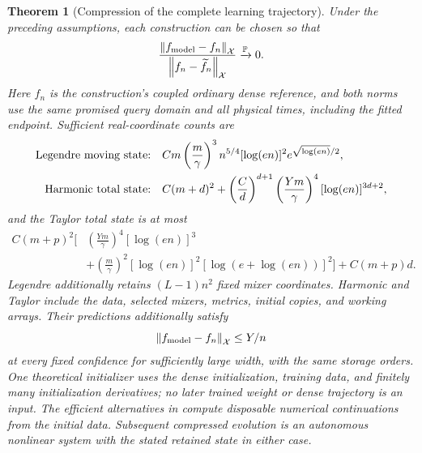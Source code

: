 \documentclass[11pt]{article}
\newtheorem{theorem}{Theorem}[section]
\theoremstyle{definition}
\theoremstyle{remark}
\newcommand{\norm}[1]{\left\lVert#1\right\rVert}
\begin{document}
\begin{theorem}[Compression of the complete learning trajectory]
\label{cp:headline}
Under the preceding assumptions, each construction can be chosen so that
\begin{equation}
 \frac{\norm{f_{\rm model}-f_n}_{\mathcal X}}
      {\norm{f_n-\widetilde f_n}_{\mathcal X}}
       \xrightarrow{\mathbb P}0.
 \label{cp:relative}
\end{equation}
Here $f_n$ is the construction's coupled ordinary dense reference, and both
norms use the same promised query domain and all physical times, including
the fitted endpoint. Sufficient real-coordinate counts are
\begin{align}
 \textnormal{Legendre moving state:}\quad&
 Cm\left(\frac m\gamma\right)^3 n^{5/4}
 [\log(en)]^2e^{\sqrt{\log(en)}/2},
 \label{cp:legendre-size}\\
 \textnormal{Harmonic total state:}\quad&
 C(m+d)^2+\left(\frac Cd\right)^{d+1}
       \left(\frac{Ym}\gamma\right)^4[\log(en)]^{3d+2},
 \label{cp:harmonic-size}
\end{align}
and the Taylor total state is at most
\begin{equation}
 \begin{split}
 C(m+p)^2\bigg[&
       \left(\frac{Ym}\gamma\right)^4[\log(en)]^3
       \\ &+\left(\frac m\gamma\right)^2[\log(en)]^2
                     [\log(e+\log(en))]^2\bigg]
       +C(m+p)d.
 \end{split}
 \label{cp:panel-size}
\end{equation}
Legendre additionally retains $(L-1)n^2$ fixed mixer coordinates.
Harmonic and Taylor include the data, selected mixers, metrics, initial
copies, and working arrays. Their predictions additionally satisfy
\begin{equation}
 \norm{f_{\rm model}-f_n}_{\mathcal X}\le Y/n
 \label{cp:absolute}
\end{equation}
at every fixed confidence for sufficiently large width, with the same
storage orders. One theoretical initializer uses the dense initialization,
training data, and finitely many initialization derivatives; no later trained
weight or dense trajectory is an input. The efficient alternatives in
 compute disposable numerical continuations from the
initial data. Subsequent compressed evolution is an autonomous nonlinear
system with the stated retained state in either case.


\end{theorem}
\end{document}
